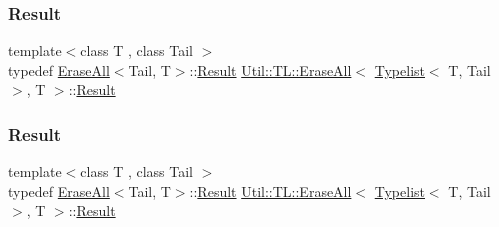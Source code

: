 \subsubsection{\texorpdfstring{Result}{Result}\hspace{0.1cm}{\footnotesize\ttfamily [1/3]}}
{\footnotesize\ttfamily template$<$class T , class Tail $>$ \\
typedef \mbox{\hyperlink{structUtil_1_1TL_1_1EraseAll}{Erase\+All}}$<$Tail, T$>$\+::\mbox{\hyperlink{structUtil_1_1TL_1_1EraseAll_3_01Typelist_3_01T_00_01Tail_01_4_00_01T_01_4_a19df041eef8d861bbb0369642bbd5378}{Result}} \mbox{\hyperlink{structUtil_1_1TL_1_1EraseAll}{Util\+::\+T\+L\+::\+Erase\+All}}$<$ \mbox{\hyperlink{structUtil_1_1Typelist}{Typelist}}$<$ T, Tail $>$, T $>$\+::\mbox{\hyperlink{structUtil_1_1TL_1_1EraseAll_3_01Typelist_3_01T_00_01Tail_01_4_00_01T_01_4_a19df041eef8d861bbb0369642bbd5378}{Result}}}

\mbox{\label{structUtil_1_1TL_1_1EraseAll_3_01Typelist_3_01T_00_01Tail_01_4_00_01T_01_4_a19df041eef8d861bbb0369642bbd5378}} 
\subsubsection{\texorpdfstring{Result}{Result}\hspace{0.1cm}{\footnotesize\ttfamily [2/3]}}
{\footnotesize\ttfamily template$<$class T , class Tail $>$ \\
typedef \mbox{\hyperlink{structUtil_1_1TL_1_1EraseAll}{Erase\+All}}$<$Tail, T$>$\+::\mbox{\hyperlink{structUtil_1_1TL_1_1EraseAll_3_01Typelist_3_01T_00_01Tail_01_4_00_01T_01_4_a19df041eef8d861bbb0369642bbd5378}{Result}} \mbox{\hyperlink{structUtil_1_1TL_1_1EraseAll}{Util\+::\+T\+L\+::\+Erase\+All}}$<$ \mbox{\hyperlink{structUtil_1_1Typelist}{Typelist}}$<$ T, Tail $>$, T $>$\+::\mbox{\hyperlink{structUtil_1_1TL_1_1EraseAll_3_01Typelist_3_01T_00_01Tail_01_4_00_01T_01_4_a19df041eef8d861bbb0369642bbd5378}{Result}}}

\mbox{\label{structUtil_1_1TL_1_1EraseAll_3_01Typelist_3_01T_00_01Tail_01_4_00_01T_01_4_a19df041eef8d861bbb0369642bbd5378}} 
